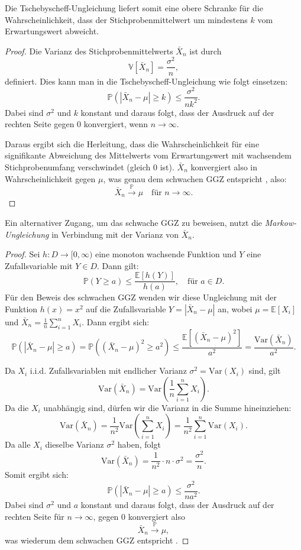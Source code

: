 \documentclass[aodsor,preprint]{imsart}
\numberwithin{equation}{section}
\theoremstyle{plain}
\begin{document}
Die Tschebyscheff-Ungleichung liefert somit eine obere Schranke für die Wahrscheinlichkeit, dass der Stichprobenmittelwert um mindestens \(k\) vom Erwartungswert abweicht.

\begin{proof}
Die Varianz des Stichprobenmittelwerts \( \bar{X}_n \) ist durch
\[
\mathbb{V}[\bar{X}_n] = \frac{\sigma^2}{n},
\]
definiert. Dies kann man in die Tschebyscheff-Ungleichung wie folgt einsetzen:
\[
\mathbb{P} \left( \left| \bar{X}_n - \mu \right| \geq k \right) \leq \frac{\sigma^2}{n k^2}.
\]
Dabei sind \(\sigma^2\) und \(k\) konstant und daraus folgt, dass der Ausdruck auf der rechten Seite gegen 0 konvergiert, wenn \(n \to \infty\). 

Daraus ergibt sich die Herleitung, dass die Wahrscheinlichkeit für eine signifikante Abweichung des Mittelwerts vom Erwartungswert mit wachsendem Stichprobenumfang verschwindet (gleich 0 ist). \(\bar{X}_n\) konvergiert also in Wahrscheinlichkeit gegen \(\mu\), was genau dem schwachen GGZ entspricht \citep{degroot2021}, also:
\[
\bar{X}_n \xrightarrow{\mathbb{P}} \mu \quad \text{für } n \to \infty.
\]
\end{proof}


Ein alternativer Zugang, um das schwache GGZ zu beweisen, nutzt die \textit{Markow-Ungleichung} \citep{georgii2009} in Verbindung mit der Varianz von \( \bar{X}_n \).

\begin{proof}
Sei \( h \colon D \to [0,\infty) \) eine monoton wachsende Funktion und \( Y \) eine Zufallsvariable mit \( Y \in D \). Dann gilt:
\[
\mathbb{P}(Y \geq a) \leq \frac{\mathbb{E}[h(Y)]}{h(a)}, \quad \text{für } a \in D.
\]
Für den Beweis des schwachen GGZ wenden wir diese Ungleichung mit der Funktion \( h(x) = x^2 \) auf die Zufallsvariable \( Y = |\bar{X}_n - \mu| \) an, wobei \( \mu = \mathbb{E}[X_i] \) und \( \bar{X}_n = \frac{1}{n} \sum_{i=1}^n X_i \). Dann ergibt sich:
\[
\mathbb{P}\left( |\bar{X}_n - \mu| \geq a \right)
= \mathbb{P}\left( (\bar{X}_n - \mu)^2 \geq a^2 \right)
\leq \frac{\mathbb{E}[(\bar{X}_n - \mu)^2]}{a^2}
= \frac{\text{Var}(\bar{X}_n)}{a^2}.
\]

Da \( X_i \) i.i.d. Zufallsvariablen mit endlicher Varianz \( \sigma^2 = \text{Var}(X_i) \) sind, gilt
\[
\text{Var}(\bar{X}_n) = \text{Var}\left( \frac{1}{n} \sum_{i=1}^n X_i \right).
\]
Da die \( X_i \) unabhängig sind, dürfen wir die Varianz in die Summe hineinziehen:
\[
\text{Var}(\bar{X}_n) = \frac{1}{n^2} \text{Var}\left( \sum_{i=1}^n X_i \right)
= \frac{1}{n^2} \sum_{i=1}^n \text{Var}(X_i).
\]
Da alle \( X_i \) dieselbe Varianz \( \sigma^2 \) haben, folgt
\[
\text{Var}(\bar{X}_n) = \frac{1}{n^2} \cdot n \cdot \sigma^2 = \frac{\sigma^2}{n}.
\]
Somit ergibt sich:
\[
\mathbb{P}\left( |\bar{X}_n - \mu| \geq a \right) \leq \frac{\sigma^2}{n a^2}.
\]
Dabei sind \(\sigma^2\) und \(a\) konstant und daraus folgt, dass der Ausdruck auf der rechten Seite für \( n \to \infty \), gegen 0 konvergiert also
\[
\bar{X}_n \xrightarrow{\mathbb{P}} \mu,
\]
was wiederum dem schwachen GGZ entspricht \citep{degroot2021}.
\end{proof}
\end{document}
